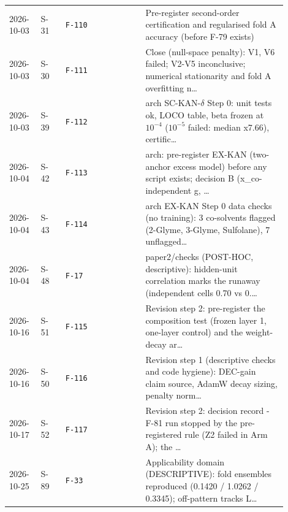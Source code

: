 {\begin{longtable}{R{0.10\linewidth} R{0.08\linewidth} R{0.26\linewidth} R{0.46\linewidth}}
2026-10-03 & S-31 & \texttt{F-110} & Pre-register second-order certification and regularised fold A accuracy (before F-79 exists) \\
2026-10-03 & S-30 & \texttt{F-111} & Close (null-space penalty): V1, V6 failed; V2-V5 inconclusive; numerical stationarity and fold A overfitting n\ldots{} \\
2026-10-03 & S-39 & \texttt{F-112} & arch SC-KAN-$\delta$ Step 0: unit tests ok, LOCO table, beta frozen at $10^{-4}$ ($10^{-5}$ failed: median x7.66), certific\ldots{} \\
2026-10-04 & S-42 & \texttt{F-113} & arch: pre-register EX-KAN (two-anchor excess model) before any script exists; decision B (x\_co-independent g, \ldots{} \\
2026-10-04 & S-43 & \texttt{F-114} & arch EX-KAN Step 0 data checks (no training): 3 co-solvents flagged (2-Glyme, 3-Glyme, Sulfolane), 7 unflagged\ldots{} \\
2026-10-04 & S-48 & \texttt{F-17} & paper2/checks (POST-HOC, descriptive): hidden-unit correlation marks the runaway (independent cells 0.70 vs 0.\ldots{} \\
2026-10-16 & S-51 & \texttt{F-115} & Revision step 2: pre-register the composition test (frozen layer 1, one-layer control) and the weight-decay ar\ldots{} \\
2026-10-16 & S-50 & \texttt{F-116} & Revision step 1 (descriptive checks and code hygiene): DEC-gain claim source, AdamW decay sizing, penalty norm\ldots{} \\
2026-10-17 & S-52 & \texttt{F-117} & Revision step 2: decision record - F-81 run stopped by the pre-registered rule (Z2 failed in Arm A); the \ldots{} \\
2026-10-25 & S-89 & \texttt{F-33} & Applicability domain (DESCRIPTIVE): fold ensembles reproduced (0.1420 / 1.0262 / 0.3345); off-pattern tracks L\ldots{} \\
\bottomrule
\end{longtable}}